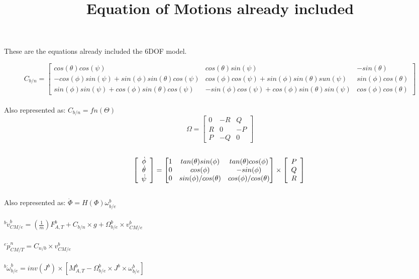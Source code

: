 \documentclass{article}
\title{Equation of Motions already included}
\begin{document}
\maketitle

These are the equations already included the 6DOF model.

\[
C_{b/n}=
  \begin{bmatrix}
    cos(\theta)cos(\psi) & cos(\theta)sin(\psi) & -sin(\theta) \\
    -cos(\phi)sin(\psi) + sin(\phi)sin(\theta)cos(\psi) & cos(\phi)cos(\psi) + sin(\phi)sin(\theta)sun(\psi) & sin(\phi)cos(\theta) \\
    sin(\phi)sin(\psi) + cos(\phi)sin(\theta)cos(\psi) & -sin(\phi)cos(\psi) + cos(\phi)sin(\theta)sin(\psi) & cos(\phi)cos(\theta)
  \end{bmatrix}
\]\\
Also represented as: $C_{b/n} = fn(\Theta)$
\\
\[
\Omega=
  \begin{bmatrix}
    0 & -R & Q \\
    R & 0 & -P\\
    P & -Q & 0
  \end{bmatrix}
\]
\\
\[
\left[ \begin{array}{c} 
   \dot{\phi}
\\ \dot{\theta}
\\ \dot{\psi}
 \end{array} \right] = \begin{bmatrix} 1 & tan(\theta)sin(\phi) & tan(\theta)cos(\phi) \\ 0 & cos(\phi) & -sin(\phi)\\
0 &  sin(\phi)/cos(\theta) & cos(\phi)/cos(\theta)
  \end{bmatrix} \times \left[ \begin{array}{c} P\\Q \\ R \end{array} \right]
\\
\]
\\ Also represented as: $\dot{\Phi} = H(\Phi) \omega^b _{b/e}$
\\
\\
${}^b\dot{v}^b_{CM/e} =(\frac{1}{m})F^b_{A,T} + C_{b/n} \times g + \Omega^b _{b/e}\times v^b_{CM/e} $
\\ \\
${}^e \dot{p}^n_{CM/T} = C_{n/b} \times v^b_{CM/e} $
\\ \\
${}^b\dot{\omega}^b_{b/e} = inv(J^b) \times [M^b_{A,T}- \Omega^b_{b/e}\times J^b \times \omega^b_{b/e}]$







 
\end{document}
